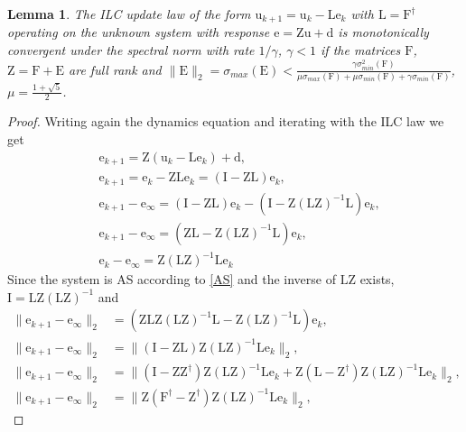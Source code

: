 \documentclass[10pt,a4paper]{article}
\theoremstyle{plain}
\newtheorem{lem}{Lemma}
\theoremstyle{definition}
\newcommand{\boldvec}[1]{\boldsymbol{\mathrm{#1}}}
\let\vec\boldvec
\newcommand{\error}{\vec{e}} %
\newcommand{\linDist}{\vec{d}} %
\newcommand{\sysInput}{\vec{u}} %
\newcommand{\latentMat}{\vec{Z}} %
\newcommand{\errorMat}{\vec{E}} %
\newcommand{\lmatrix}{\vec{L}} %
\newcommand{\systemMat}{\vec{F}} %
\begin{document}
%
\begin{lem} The ILC update law of the form $\sysInput_{k+1} = \sysInput_{k} - \lmatrix \error_{k}$ with $\lmatrix = \systemMat^{\dagger}$ operating on the unknown system with response $\error = \latentMat \sysInput + \linDist$ is monotonically convergent under the spectral norm with rate $1/\gamma$, $\gamma < 1$ if the matrices $\systemMat$, $\latentMat = \systemMat + \errorMat$ are full rank and $\|\errorMat\|_2 = \sigma_{max}(\errorMat) < \frac{\gamma\sigma_{min}^{2}(\systemMat)}{\mu\sigma_{max}(\systemMat) + \mu\sigma_{min}(\systemMat) + \gamma\sigma_{min}(\systemMat)}$, $\mu = \frac{1 + \sqrt{5}}{2}$.  \end{lem}
%
\begin{proof}
Writing again the dynamics equation and iterating with the ILC law we get
%
\begin{align}
&\error_{k+1} = \latentMat(\sysInput_k - \lmatrix\error_k) + \linDist, \\
&\error_{k+1} = \error_{k} - \latentMat\lmatrix\error_k = (\vec{I} - \latentMat\lmatrix)\error_k, \\
&\error_{k+1} - \error_{\infty} = (\vec{I} - \latentMat\lmatrix)\error_k - (\vec{I} - \latentMat(\lmatrix\latentMat)^{-1}\lmatrix)\error_k, \\
&\error_{k+1} - \error_{\infty} = (\latentMat\lmatrix - \latentMat(\lmatrix\latentMat)^{-1}\lmatrix)\error_k, \\
&\error_{k} - \error_{\infty} = \latentMat(\lmatrix\latentMat)^{-1}\lmatrix\error_k
\end{align}
%
Since the system is AS according to \ref{AS} and the inverse of $\lmatrix\latentMat$ exists, $\vec{I} = \lmatrix\latentMat(\lmatrix\latentMat)^{-1}$ and
%
\begin{align}
\|\error_{k+1} - \error_{\infty}\|_2 &= (\latentMat\lmatrix\latentMat(\lmatrix\latentMat)^{-1}\lmatrix - \latentMat(\lmatrix\latentMat)^{-1}\lmatrix)\error_k, \\
\|\error_{k+1} - \error_{\infty}\|_2 &= \|(\vec{I} - \latentMat\lmatrix)\latentMat(\lmatrix\latentMat)^{-1}\lmatrix\error_k\|_2, \\
\|\error_{k+1} - \error_{\infty}\|_2 &= \|(\vec{I} - \latentMat\latentMat^{\dagger})\latentMat(\lmatrix\latentMat)^{-1}\lmatrix\error_k + \latentMat(\lmatrix - \latentMat^{\dagger})\latentMat(\lmatrix\latentMat)^{-1}\lmatrix\error_k\|_2, \\
\|\error_{k+1} - \error_{\infty}\|_2 &= \|\latentMat(\systemMat^{\dagger} - \latentMat^{\dagger})\latentMat(\lmatrix\latentMat)^{-1}\lmatrix\error_k\|_2,

\end{align}
\end{proof}
\end{document}
